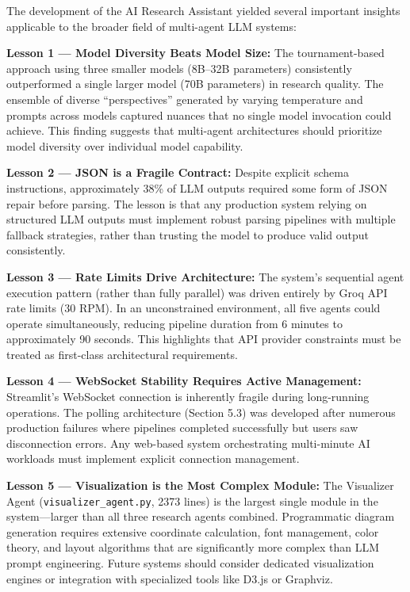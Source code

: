 \documentclass[a4paper,12pt,openany]{report}
\begin{document}
The development of the AI Research Assistant yielded several important insights applicable to the broader field of multi-agent LLM systems:

\textbf{Lesson 1 --- Model Diversity Beats Model Size:} The tournament-based approach using three smaller models (8B--32B parameters) consistently outperformed a single larger model (70B parameters) in research quality. The ensemble of diverse ``perspectives'' generated by varying temperature and prompts across models captured nuances that no single model invocation could achieve. This finding suggests that multi-agent architectures should prioritize model diversity over individual model capability.

\textbf{Lesson 2 --- JSON is a Fragile Contract:} Despite explicit schema instructions, approximately 38\% of LLM outputs required some form of JSON repair before parsing. The lesson is that any production system relying on structured LLM outputs must implement robust parsing pipelines with multiple fallback strategies, rather than trusting the model to produce valid output consistently.

\textbf{Lesson 3 --- Rate Limits Drive Architecture:} The system's sequential agent execution pattern (rather than fully parallel) was driven entirely by Groq API rate limits (30 RPM). In an unconstrained environment, all five agents could operate simultaneously, reducing pipeline duration from 6 minutes to approximately 90 seconds. This highlights that API provider constraints must be treated as first-class architectural requirements.

\textbf{Lesson 4 --- WebSocket Stability Requires Active Management:} Streamlit's WebSocket connection is inherently fragile during long-running operations. The polling architecture (Section 5.3) was developed after numerous production failures where pipelines completed successfully but users saw disconnection errors. Any web-based system orchestrating multi-minute AI workloads must implement explicit connection management.

\textbf{Lesson 5 --- Visualization is the Most Complex Module:} The Visualizer Agent (\texttt{visualizer\_agent.py}, 2373 lines) is the largest single module in the system---larger than all three research agents combined. Programmatic diagram generation requires extensive coordinate calculation, font management, color theory, and layout algorithms that are significantly more complex than LLM prompt engineering. Future systems should consider dedicated visualization engines or integration with specialized tools like D3.js or Graphviz.
\end{document}

